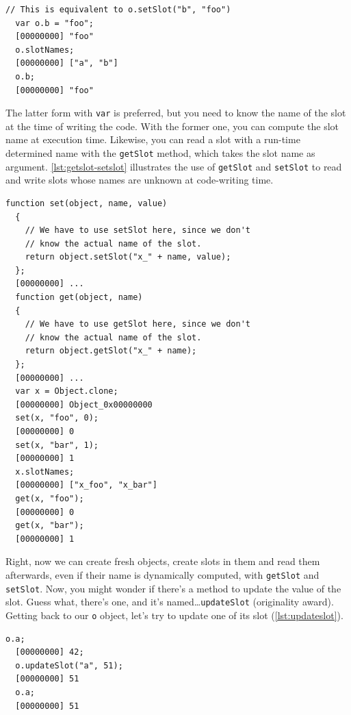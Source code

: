 \documentclass[openright,twoside,12pt]{report}
\newcommand{\lst}[1]{\autoref{lst:#1}}
\begin{document}
\begin{lstlisting}[caption=Defining slots with var, label=lst:setslot-var]
  // This is equivalent to o.setSlot("b", "foo")
  var o.b = "foo";
  [00000000] "foo"
  o.slotNames;
  [00000000] ["a", "b"]
  o.b;
  [00000000] "foo"
\end{lstlisting}

The latter form with \texttt{var} is preferred, but you need to know
the name of the slot at the time of writing the code. With the former
one, you can compute the slot name at execution time. Likewise, you
can read a slot with a run-time determined name with the
\texttt{getSlot} method, which takes the slot name as
argument. \lst{getslot-setslot} illustrates the use of
\texttt{getSlot} and \texttt{setSlot} to read and write slots whose
names are unknown at code-writing time.


\begin{lstlisting}[caption=Dynamic slots with getSlot and setSlot,
  label=lst:getslot-setslot]
  function set(object, name, value)
  {
    // We have to use setSlot here, since we don't
    // know the actual name of the slot.
    return object.setSlot("x_" + name, value);
  };
  [00000000] ...
  function get(object, name)
  {
    // We have to use getSlot here, since we don't
    // know the actual name of the slot.
    return object.getSlot("x_" + name);
  };
  [00000000] ...
  var x = Object.clone;
  [00000000] Object_0x00000000
  set(x, "foo", 0);
  [00000000] 0
  set(x, "bar", 1);
  [00000000] 1
  x.slotNames;
  [00000000] ["x_foo", "x_bar"]
  get(x, "foo");
  [00000000] 0
  get(x, "bar");
  [00000000] 1
\end{lstlisting}

Right, now we can create fresh objects, create slots in them and read
them afterwards, even if their name is dynamically computed, with
\texttt{getSlot} and \texttt{setSlot}. Now, you might wonder if
there's a method to update the value of the slot. Guess what, there's
one, and it's named\ldots \texttt{updateSlot} (originality
award). Getting back to our \texttt{o} object, let's try to update one
of its slot (\lst{updateslot}).

\begin{lstlisting}[caption=Updating a slot, label=lst:updateslot]
  o.a;
  [00000000] 42;
  o.updateSlot("a", 51);
  [00000000] 51
  o.a;
  [00000000] 51
\end{lstlisting}
\end{document}
